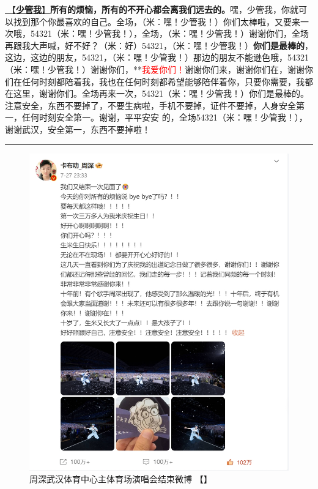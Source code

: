 \documentclass[]{ctexbook}
\begin{document}
\hyperref[watch-ur-manners]{🎵【\textbf{少管我}】}\textbf{所有的烦恼，所有的不开心都会离我们远去的。}嘿，少管我，你就可以找到那个你最喜欢的自己。全场，（米：嘿！少管我！）你们太棒啦，又要来一次哦，54321（米：嘿！少管我！），全场，（米：嘿！少管我！）谢谢你们，全场再跟我大声喊，好不好？（米：好）54321，（米：嘿！少管我！）\textbf{你们是最棒的}，这边，这边的朋友，54321，（米：嘿！少管我！）那边的朋友不能逊色哦，54321（米：嘿！少管我！）谢谢你们，**\textcolor{red}{我爱你们！}谢谢你们来，谢谢你们在，谢谢你们在任何时刻都陪着我，我也在任何时刻都希望能够陪伴着你，只要你需要，我都在这里，谢谢你们。全场再来一次，54321（米：嘿！少管我！）你们是最棒的。注意安全，东西不要掉了，不要生病啦，手机不要掉，证件不要掉，人身安全第一，任何时刻安全第一。谢谢，平平安安 的，全场54321（米：嘿！少管我！），谢谢武汉，安全第一，东西不要掉啦！

\begin{center}\rule{0.5\linewidth}{0.5pt}\end{center}

\begin{figure}
\centering
\includegraphics{img/weibo/wuhan-20240727.png}
\caption{\label{fig:unnamed-chunk-57}周深武汉体育中心主体育场演唱会结束微博 【\citet{weibo-charlie}】}
\end{figure}
\end{document}
